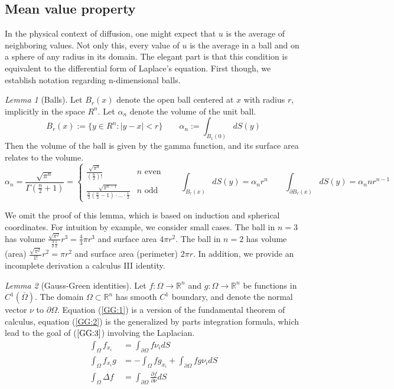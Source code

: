 \documentclass[titlepage]{article}
\renewcommand{\;}{\:\:\:} %
\newcommand{\f}[2]{\frac{#1}{#2}} %
\newcommand{\R}{\mathbb{R}} %
\renewcommand{\bar}[1]{\overline{#1}} %
\newcommand{\p}{\partial} %
\theoremstyle{definition}
\theoremstyle{theorem}
\theoremstyle{remark}
\theoremstyle{lemma}
\newtheorem*{lemma}{Lemma}
\begin{document}
\subsection*{Mean value property}
In the physical context of diffusion, one might expect that $u$ is the average of neighboring values. Not only this, every value of $u$ is the average in a ball and on a sphere of any radius in its domain. The elegant part is that this condition is equivalent to the differential form of Laplace's equation. First though, we establish notation regarding n-dimensional balls.
\begin{lemma}[Balls]
Let $B_r(x)$ denote the open ball centered at $x$ with radius $r$, implicitly in the space $R^n$. Let $\alpha_n$ denote the volume of the unit ball.
$$ B_r(x) := \{y \in R^n : |y - x| < r\} \qquad \alpha_n := \int_{B_1(0)} dS(y) $$
Then the volume of the ball is given by the gamma function, and its surface area relates to the volume.
$$ \alpha_n = \f{\sqrt{\pi^n}}{\Gamma(\frac{n}{2} + 1)} = \begin{cases}
\f{\sqrt{\pi^n}}{(\f{n}{2})!} & n \text{ even} \\
\f{\sqrt{\pi^{n-1}}}{\f{n}{2} \left(\f{n}{2}-1\right) \cdot ... \cdot \f12} & n \text{ odd} \end{cases} \qquad
\int_{B_r(x)} dS(y) = \alpha_n r^n \qquad
\int_{\p B_r(x)} dS(y) = \alpha_n n r^{n-1} $$
\end{lemma}
We omit the proof of this lemma, which is based on induction and spherical coordinates. For intuition by example, we consider small cases. The ball in $n=3$ has volume $\f{\sqrt{\pi^2}}{\f32 \f12} r^3 = \f43 \pi r^3$ and surface area $4 \pi r^2$. The ball in $n=2$ has volume (area) $\f{\sqrt{\pi^2}}{1!} r^2 = \pi r^2$ and surface area (perimeter) $2\pi r$. In addition, we provide an incomplete derivation a calculus III identity.
\begin{lemma}[Gauss-Green identities]
Let $f:\Omega\rightarrow\R^n$ and $g:\Omega\rightarrow\R^n$ be functions in $C^1(\bar{\Omega})$. The domain $\Omega \subset \R^n$ has smooth $C^1$ boundary, and denote the normal vector $\nu$ to $\p \Omega$. Equation (\ref{GG:1}) is a version of the fundamental theorem of calculus, equation (\ref{GG:2}) is the generalized by parts integration formula, which lead to the goal of ($\ref{GG:3}$) involving the Laplacian.
\begin{subequations}
\begin{align}
    \int_{\Omega} f_{x_i} &= \int_{\p \Omega} f \nu_i dS \label{GG:1} \\
    \int_{\Omega} f_{x_i} g &= -\int_{\Omega} f g_{x_i} + \int_{\p \Omega} f g \nu_i dS \label{GG:2} \\
    \int_{\Omega} \Delta f &= \int_{\p \Omega} \f{\p f}{\p \nu} dS \label{GG:3}
\end{align}
\end{subequations}
\end{lemma}
\end{document}
